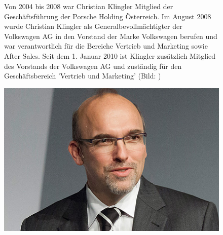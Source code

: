 \documentclass[12pt]{article}
\begin{document}
\begin{figure}[!h]
	\centering
	\begin{minipage}[h]{0.65\textwidth}
		Von 2004 bis 2008 war Christian Klingler Mitglied der Geschäftsführung der Porsche Holding Österreich.
		Im August 2008 wurde Christian Klingler als Generalbevollmächtigter der Volkswagen AG in den Vorstand der Marke Volkswagen berufen und war verantwortlich für die Bereiche Vertrieb und Marketing sowie After Sales. Seit dem 1. Januar 2010 ist Klingler zusätzlich Mitglied des Vorstands der Volkswagen AG und zuständig für den Geschäftsbereich 'Vertrieb und Marketing'  (Bild: \cite{ckpic} )
	\end{minipage}
	\begin{minipage}[h]{0.10\textwidth}
		\hspace{1cm} 
	\end{minipage}
	\begin{minipage}[h]{0.20\textwidth}
		\centering
		\includegraphics[width=1.0\textwidth]{images/ChristianKlingler.jpg}
		\label{fig:vorstandvw3}
	\end{minipage}
\end{figure}
\end{document}
